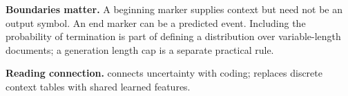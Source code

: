 \textbf{Boundaries matter.} A beginning marker supplies context but need
not be an output symbol. An end marker can be a predicted event. Including
the probability of termination is part of defining a distribution over
variable-length documents; a generation length cap is a separate practical rule.

\textbf{Reading connection.}  connects uncertainty with
coding;  replaces discrete context tables with shared learned features.
